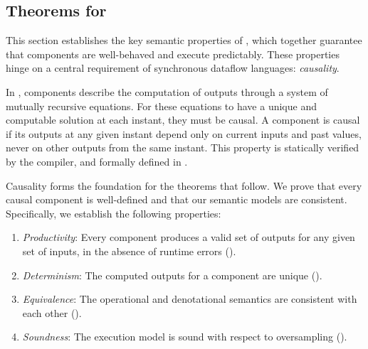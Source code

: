 \subsection{Theorems for \GRSync}
\label{sec:semantics:grsync:theorems}

This section establishes the key semantic properties of \GRSync, which together guarantee that
components are well-behaved and execute predictably. These properties hinge on a central requirement
of synchronous dataflow languages: \emph{causality}.

In \GRSync, components describe the computation of outputs through a system of mutually recursive
equations. For these equations to have a unique and computable solution at each instant, they must
be causal. A component is causal if its outputs at any given instant depend only on current inputs
and past values, never on other outputs from the same instant. This property is statically verified
by the compiler, and formally defined in .

Causality forms the foundation for the theorems that follow. We prove that every causal component is
well-defined and that our semantic models are consistent. Specifically, we establish the following
properties:
\begin{enumerate}
      \item \emph{Productivity}: Every component produces a valid set of outputs for any given set
            of inputs, in the absence of runtime errors
            ().
      \item \emph{Determinism}: The computed outputs for a component are unique
            ().
      \item \emph{Equivalence}: The operational and denotational semantics are consistent
            with each other ().
      \item \emph{Soundness}: The execution model is sound with respect to oversampling
            ().
\end{enumerate}









